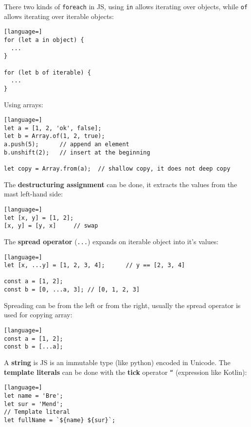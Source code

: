 \documentclass[12pt]{article}
\begin{document}
There two kinds of \texttt{foreach} in JS, using \texttt{in} allows iterating over objects, while \texttt{of} allows iterating over iterable objects:
\begin{lstlisting}[language=]
for (let a in object) {
  ...
}

for (let b of iterable) {
  ...
}
\end{lstlisting}
Using arrays:
\begin{lstlisting}[language=]
let a = [1, 2, 'ok', false];
let b = Array.of(1, 2, true);
a.push(5);      // append an element
b.unshift(2);   // insert at the beginning

let copy = Array.from(a);  // shallow copy, it does not deep copy
\end{lstlisting}
The \textbf{destructuring assignment} can be done, it extracts the values from the mast left-hand side:
\begin{lstlisting}[language=]
let [x, y] = [1, 2];
[x, y] = [y, x]     // swap
\end{lstlisting}
The \textbf{spread operator} (\texttt{...}) expands on iterable object into it's values:
\begin{lstlisting}[language=]
let [x, ...y] = [1, 2, 3, 4];      // y == [2, 3, 4]

const a = [1, 2];
const b = [0, ...a, 3]; // [0, 1, 2, 3]
\end{lstlisting}
Spreading can be from the left or from the right, usually the spread operator is used for copying array:
\begin{lstlisting}[language=]
const a = [1, 2];
const b = [...a];
\end{lstlisting}
A \textbf{string} is JS is an immutable type (like python) encoded in Unicode. The \textbf{template literals} can be done with the \textbf{tick} operator \texttt{``} (expression like Kotlin):
\begin{lstlisting}[language=]
let name = 'Bre';
let sur = 'Mend';
// Template literal
let fullName = `${name} ${sur}`;
\end{lstlisting}
\end{document}
